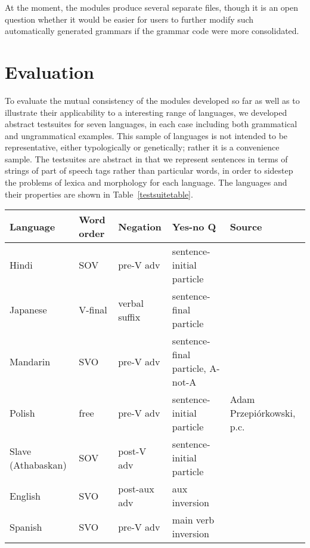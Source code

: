 \documentclass[11pt]{article}
\begin{document}
At the moment, the modules produce
several separate files, though it is an open question whether
it would be easier for users to further modify such automatically
generated grammars if the grammar code were more consolidated.

\section{Evaluation}

To evaluate the mutual consistency of the modules developed so far as
well as to illustrate their applicability to a interesting range of
languages, we developed abstract testsuites for seven languages, in
each case including both grammatical and ungrammatical examples.  This
sample of languages is not intended to be representative, either
typologically or genetically; rather it is a convenience sample.  The
testsuites are abstract in that we represent sentences in terms of
strings of part of speech tags rather than particular words, in order
to sidestep the problems of lexica and morphology for each language.
The languages and their properties are shown in
Table~\ref{testsuitetable}.

\begin{table*}[ht]
\begin{center}
\small
\begin{tabular}{lllll}
\hline
Language & Word order & Negation & Yes-no Q\footnotemark & Source\\ \hline
Hindi    & SOV        & pre-V adv 	& sentence-initial particle& \cite{Sne:Wei:00}\\
Japanese & V-final    & verbal suffix   & sentence-final particle & \\
Mandarin & SVO	      & pre-V adv	& sentence-final particle, A-not-A & \cite{Li*81}\\
Polish   & free	      & pre-V adv       & sentence-initial particle & Adam Przepi\'{o}rkowski, p.c.\\
Slave (Athabaskan) & SOV & post-V adv	& sentence-initial particle & \cite{Rice89}\\
English  & SVO	      & post-aux adv\footnotemark	& aux inversion &\\
Spanish  & SVO	      & pre-V adv	& main verb inversion & \\ \hline
\end{tabular}
\end{center}
\caption{Languages used in testing}
\label{testsuitetable}
\end{table*}
\end{document}
